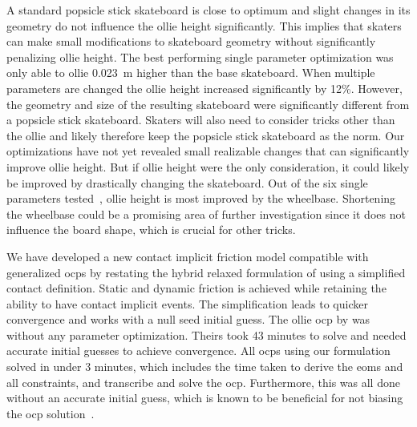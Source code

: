 \documentclass[default,iicol]{sn-jnl}
\begin{document}
A standard popsicle stick skateboard is close to optimum and slight changes in its geometry do not influence the ollie height significantly.
This implies that skaters can make small modifications to skateboard geometry without significantly penalizing ollie height.
The best performing single parameter optimization was only able to ollie \SI{0.023}{\meter} higher than the base skateboard.
When multiple parameters are changed the ollie height increased significantly by 12\%.
However, the geometry and size of the resulting skateboard were significantly different from a popsicle stick skateboard.
Skaters will also need to consider tricks other than the ollie and likely therefore keep the popsicle stick skateboard as the norm. Our optimizations have not yet revealed small realizable changes that can  significantly improve ollie height.
But if ollie height were the only consideration, it could likely be improved by drastically changing the skateboard.
Out of the six single parameters tested~\cite{heinen_optimal_2022}, ollie height is most improved by the wheelbase.
Shortening the wheelbase could be a promising area of further investigation since it does not influence the board shape, which is crucial for other tricks.

We have developed a new contact implicit friction model compatible with generalized \gls{ocp}s by restating the hybrid relaxed formulation of \citet{patel_contact-implicit_2019} using a simplified contact definition.
Static and dynamic friction is achieved while retaining the ability to have contact implicit events.
The simplification leads to quicker convergence and works with a null seed initial guess.
The ollie \gls{ocp} by \citet{shield_contact-implicit_2022} was without any parameter optimization. Theirs took 43 minutes to solve and needed accurate initial guesses to achieve convergence.
All \glspl{ocp} using our formulation solved in under 3 minutes, which includes the time taken to derive the \glspl{eom} and all constraints, and transcribe and solve the \gls{ocp}.
Furthermore, this was all done without an accurate initial guess, which is known to be beneficial for not biasing the \gls{ocp} solution~\cite{betts_practical_2010}.
\end{document}
